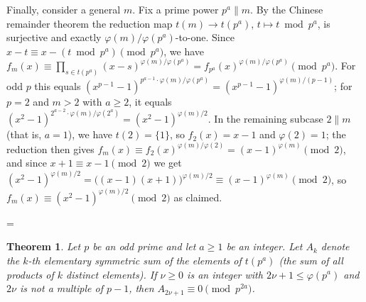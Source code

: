 \documentclass[11pt]{article}
\makeatletter
\theoremstyle{ntstyle}
\newtheorem{theorem}{Theorem}[subsection]
\let\nt@closedisplay\]
\def\nt@guardedclose{\@ifnextchar\par{\nt@closeafterpar}{\@ifnextchar\end{\postdisplaypenalty\@M\nt@closedisplay}{\nt@closedisplay}}}
\def\nt@closeafterpar\par{\@ifnextchar\par{\nt@closeafterpar}{\@ifnextchar\end{\postdisplaypenalty\@M\nt@closedisplay\par}{\nt@closedisplay\par}}}
\renewenvironment{proof}[1][\proofname]{\par
  \pushQED{\qed}\normalfont\topsep\medskipamount\edef\nt@afterproof{\@endparpenalty=\the\@endparpenalty\relax}\@beginparpenalty\@M\@endparpenalty\@M\let\]\nt@guardedclose\trivlist\item[]\textit{#1\@addpunct{.}} \ignorespaces}{\ifvmode\addpenalty\@M\fi\popQED\nt@afterproof\endtrivlist\@endpefalse}
\makeatother
\begin{document}
\begin{proof}
	Finally, consider a general $m$. Fix a prime power $p^{a} \parallel m$.
	By the Chinese remainder theorem the reduction map $t(m) \to t(p^{a})$, $t \mapsto t \bmod
		p^{a}$, is surjective and exactly $\varphi(m)/\varphi(p^{a})$-to-one.
	Since $x - t \equiv x - (t \bmod p^{a}) \pmod{p^{a}}$, we have $f_m(x) \equiv
		\prod_{s \in t(p^{a})}(x - s)^{\varphi(m)/\varphi(p^{a})} =
		f_{p^{a}}(x)^{\varphi(m)/\varphi(p^{a})} \pmod{p^{a}}$. For odd $p$
	this equals $(x^{p-1}-1)^{p^{a-1}\cdot \varphi(m)/\varphi(p^{a})} =
		(x^{p-1}-1)^{\varphi(m)/(p-1)}$; for $p = 2$ and $m > 2$ with $a \ge 2$, it equals
	$(x^{2}-1)^{2^{a-2}\cdot\varphi(m)/\varphi(2^{a})} =
		(x^{2}-1)^{\varphi(m)/2}$. In the remaining subcase
	$2 \parallel m$ (that is, $a = 1$), we have $t(2) = \{1\}$, so
	$f_{2}(x) = x - 1$ and $\varphi(2) = 1$; the reduction then gives
	$f_m(x) \equiv f_{2}(x)^{\varphi(m)/\varphi(2)} = (x-1)^{\varphi(m)}
		\pmod{2}$, and since $x + 1 \equiv x - 1 \pmod{2}$ we get
	$(x^{2}-1)^{\varphi(m)/2} = \big((x-1)(x+1)\big)^{\varphi(m)/2} \equiv
		(x-1)^{\varphi(m)} \pmod{2}$, so $f_m(x) \equiv (x^{2}-1)^{\varphi(m)/2}
		\pmod{2}$ as claimed.

\end{proof}
\begin{theorem}\label{thm:6.9.2} Let $p$ be an odd prime and let $a\ge1$ be an integer. Let $A_{k}$
	denote the $k$-th elementary symmetric sum of the elements of
	$t(p^{a})$ (the sum of all products of $k$ distinct elements). If $\nu\ge0$ is an integer with $2\nu+1\le\varphi(p^{a})$ and $2\nu$ is not a multiple of $p-1$, then $A_{2\nu+1} \equiv 0 \pmod{p^{2a}}$.

\end{theorem}
\end{document}
